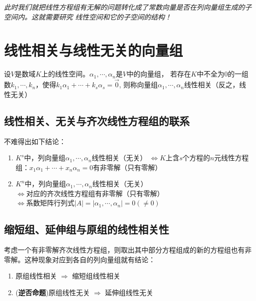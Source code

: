 \emph{此时我们就把线性方程组有无解的问题转化成了常数向量是否在列向量组生成的子空间内。这就需要研究
线性空间和它的子空间的结构！}

\section{线性相关与线性无关的向量组}

\begin{definition}[线性相关，无关]
    设$V$是数域$K$上的线性空间。$\alpha_1, \cdots, \alpha_n$是$V$中的向量组，
    若存在$K$中不全为$0$的一组数$k_1, \cdots, k_n$，使得$k_1\alpha_1 + \cdots + k_s\alpha_s = \vec{0}$,
    则称向量组$\alpha_1, \cdots, \alpha_n$线性相关（反之，线性无关）
\end{definition}

\subsection*{线性相关、无关与齐次线性方程组的联系}
不难得出如下结论：
\begin{enumerate}
    \item \begin{proposition}
        $K^s$中，列向量组$\alpha_1, \cdots, \alpha_n$线性相关（无关）
        $\Leftrightarrow$$K$上含$s$个方程的$n$元线性方程组：$x_1\alpha_1 + \cdots + x_n\alpha_n=0$有非零解（只有零解）
    \end{proposition}

    \item \begin{proposition}
        $K^n$中，列向量组$\alpha_1, \cdots, \alpha_n$线性相关（无关）\\
        $\Leftrightarrow$对应的齐次线性方程组有非零解（只有零解）\\
        $\Leftrightarrow$系数矩阵行列式$|A| = |\alpha_1, \cdots, \alpha_n| = 0(\neq 0)$
    \end{proposition}
\end{enumerate}

\subsection*{缩短组、延伸组与原组的线性相关性}
考虑一个有非零解齐次线性方程组，则取出其中部分方程组成的新的方程组也有非零解。这种现象对应到各自的列向量组就有结论：
\begin{enumerate}
    \item 原组线性相关 $\Rightarrow$ 缩短组线性相关
    \item (\textbf{逆否命题})原组线性无关 $\Rightarrow$ 延伸组线性无关 
\end{enumerate}

